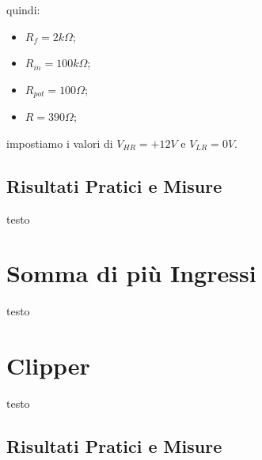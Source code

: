 quindi:


\begin{itemize}
    \item $R_f = 2k\Omega$;
    \item $R_{in} = 100k\Omega$;
    \item $R_{pot} = 100\Omega$;
    \item $R = 390\Omega$;
\end{itemize}

impostiamo i valori di $V_{HR}=+12V$ e $V_{LR}=0V$.


\subsection*{Risultati Pratici e Misure}


testo


\section{Somma di più Ingressi}


testo


\section{Clipper}


testo


\subsection*{Risultati Pratici e Misure}

